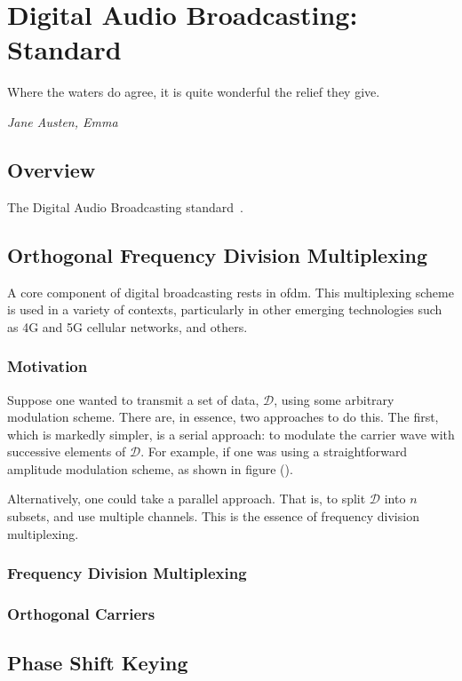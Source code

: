 \documentclass[class=report,11pt,crop=false]{standalone}
\begin{document}
\chapter{Digital Audio Broadcasting: Standard}
\epigraph{Where the waters do agree, it is quite wonderful the relief they give.}%
{\emph{Jane Austen, Emma}}

\section{Overview}
The Digital Audio Broadcasting standard~\cite{dabstandard}.

\section{Orthogonal Frequency Division Multiplexing}
A core component of digital broadcasting rests in \acrfull{ofdm}. This multiplexing scheme is used in a variety of contexts, particularly in other emerging technologies such as 4G and 5G cellular networks, and others.

\subsection{Motivation}
Suppose one wanted to transmit a set of data, \(\mathcal{D}\), using some arbitrary modulation scheme. There are, in essence, two approaches to do this. The first, which is markedly simpler, is a serial approach: to modulate the carrier wave with successive elements of \(\mathcal{D}\). For example, if one was using a straightforward amplitude modulation scheme, as shown in figure ().

Alternatively, one could take a parallel approach. That is, to split \(\mathcal{D}\) into \(n\) subsets, and use multiple channels. This is the essence of frequency division multiplexing.

\subsection{Frequency Division Multiplexing}



\subsection{Orthogonal Carriers}


\section{Phase Shift Keying}
\end{document}
